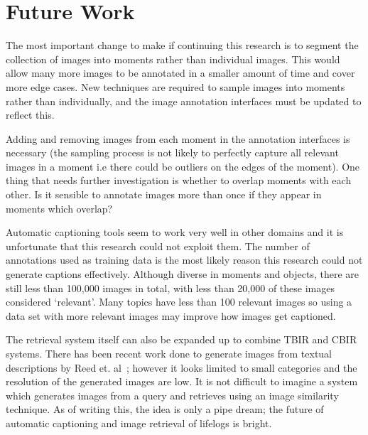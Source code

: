 \chapter{Future Work}

The most important change to make if continuing this research is to segment the collection of images into moments rather than individual images. This would allow many more images to be annotated in a smaller amount of time and cover more edge cases. New techniques are required to sample images into moments rather than individually, and the image annotation interfaces must be updated to reflect this. 

Adding and removing images from each moment in the annotation interfaces is necessary (the sampling process is not likely to perfectly capture all relevant images in a moment i.e there could be outliers on the edges of the moment). One thing that needs further investigation is whether to overlap moments with each other. Is it sensible to annotate images more than once if they appear in moments which overlap?

Automatic captioning tools seem to work very well in other domains and it is unfortunate that this research could not exploit them. The number of annotations used as training data is the most likely reason this research could not generate captions effectively. Although diverse in moments and objects, there are still less than 100,000 images in total, with less than 20,000 of these images considered `relevant'. Many topics have less than 100 relevant images so using a data set with more relevant images may improve how images get captioned. 

The retrieval system itself can also be expanded up to combine TBIR and CBIR systems. There has been recent work done to generate images from textual descriptions by Reed et. al~\cite{reed2016generative}; however it looks limited to small categories and the resolution of the generated images are low. It is not difficult to imagine a system which generates images from a query and retrieves using an image similarity technique. As of writing this, the idea is only a pipe dream; the future of automatic captioning and image retrieval of lifelogs is bright.

 
